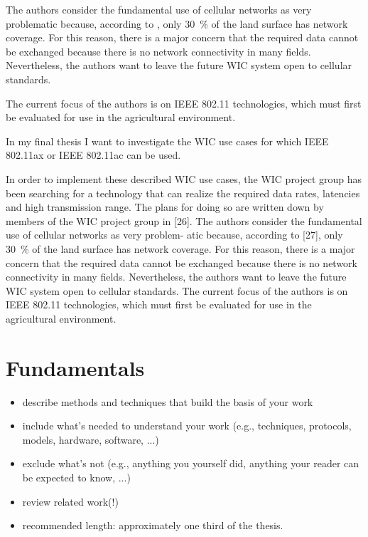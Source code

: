 \documentclass[]{nsm-thesis}
\begin{document}
The authors consider the fundamental use of cellular networks as very problematic because, according to \cite{itu2016facts}, only \SI{30}{\percent} of the land surface has network coverage. For this reason, there is a major concern that the required data cannot be exchanged because there is no network connectivity in many fields. Nevertheless, the authors want to leave the future \ac{WIC} system open to cellular standards.

The current focus of the authors is on IEEE 802.11 technologies, which must first be evaluated for use in the agricultural environment.

In my final thesis I want to investigate the \ac{WIC} use cases for which IEEE 802.11ax or IEEE 802.11ac can be used.

In order to implement these described WIC use cases, the WIC project group has
been searching for a technology that can realize the required data rates, latencies
and high transmission range. The plans for doing so are written down by members
of the WIC project group in [26].
The authors consider the fundamental use of cellular networks as very problem-
atic because, according to [27], only \SI{30}{\percent} of the land surface has network coverage.
For this reason, there is a major concern that the required data cannot be exchanged
because there is no network connectivity in many fields. Nevertheless, the authors
want to leave the future WIC system open to cellular standards.
The current focus of the authors is on IEEE 802.11 technologies, which must
first be evaluated for use in the agricultural environment.

\chapter{Fundamentals}
\label{sec:fundamentals}



\begin{itemize}
\item describe methods and techniques that build the basis of your work
\item include what's needed to understand your work (e.g., techniques, protocols, models, hardware, software, ...)
\item exclude what's not (e.g., anything you yourself did, anything your reader can be expected to know, ...)
\item review related work(!)
\item recommended length: approximately one third of the thesis.
\end{itemize}
\end{document}
